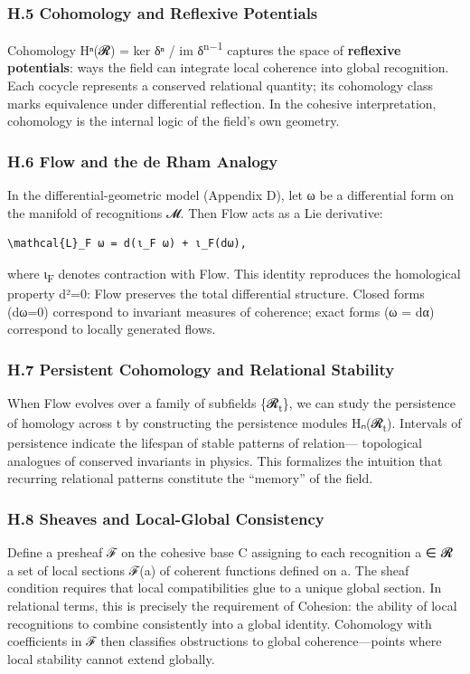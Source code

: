 \documentclass[11pt]{article}
\begin{document}
\subsubsection*{H.5 Cohomology and Reflexive Potentials}
\label{sec:org3935f22}
Cohomology Hⁿ(𝓡) = ker δⁿ / im δ\textsuperscript{n−1}  
captures the space of \textbf{reflexive potentials}:  
ways the field can integrate local coherence into global recognition.  
Each cocycle represents a conserved relational quantity;  
its cohomology class marks equivalence under differential reflection.  
In the cohesive interpretation, cohomology is the internal logic of the field’s own geometry.
\subsubsection*{H.6 Flow and the de Rham Analogy}
\label{sec:orga31e1fd}
In the differential-geometric model (Appendix D),  
let ω be a differential form on the manifold of recognitions 𝓜.  
Then Flow acts as a Lie derivative:

\begin{verbatim}
\mathcal{L}_F ω = d(ι_F ω) + ι_F(dω),
\end{verbatim}

where ι\textsubscript{F} denotes contraction with Flow.  
This identity reproduces the homological property d²=0:  
Flow preserves the total differential structure.  
Closed forms (dω=0) correspond to invariant measures of coherence;  
exact forms (ω = dα) correspond to locally generated flows.
\subsubsection*{H.7 Persistent Cohomology and Relational Stability}
\label{sec:orga78e81b}
When Flow evolves over a family of subfields \{𝓡\textsubscript{t}\},  
we can study the persistence of homology across t  
by constructing the persistence modules Hₙ(𝓡\textsubscript{t}).  
Intervals of persistence indicate  
the lifespan of stable patterns of relation—  
topological analogues of conserved invariants in physics.  
This formalizes the intuition that  
recurring relational patterns constitute the “memory” of the field.
\subsubsection*{H.8 Sheaves and Local-Global Consistency}
\label{sec:orgb868e3e}
Define a presheaf ℱ on the cohesive base C  
assigning to each recognition a ∈ 𝓡 a set of local sections ℱ(a)  
of coherent functions defined on a.  
The sheaf condition requires  
that local compatibilities glue to a unique global section.  
In relational terms, this is precisely the requirement of Cohesion:  
the ability of local recognitions to combine consistently into a global identity.  
Cohomology with coefficients in ℱ then classifies obstructions  
to global coherence—points where local stability cannot extend globally.
\end{document}
